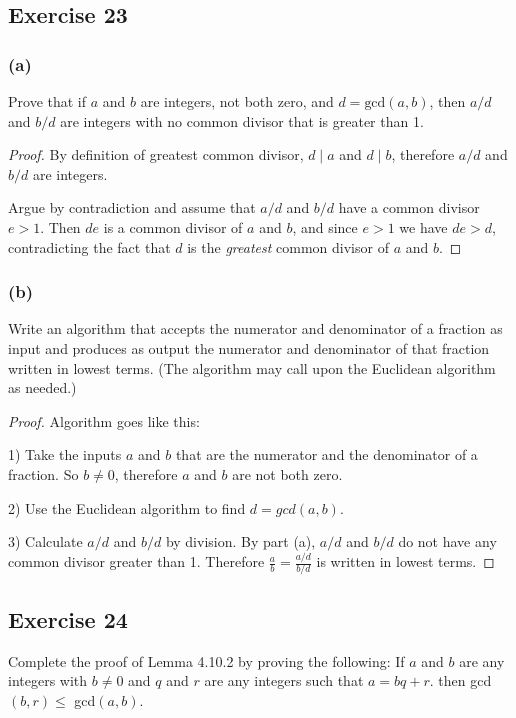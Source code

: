 \documentclass[14pt]{extarticle}
\newcommand{\dps}{\displaystyle}
\begin{document}
\subsection{Exercise 23}
\subsubsection{(a)}
Prove that if $a$ and $b$ are integers, not both zero, and $d = \text{gcd}(a, b)$, then $a/d$ and $b/d$ are integers with no common divisor that is greater than 1.

\begin{proof}
    By definition of greatest common divisor, $d \mid a$ and $d \mid b$, therefore $a/d$ and $b/d$ are integers.

    Argue by contradiction and assume that $a/d$ and $b/d$ have a common divisor $e > 1$. Then $de$ is a common divisor of $a$ and $b$, and since $e > 1$ we have $de > d$, contradicting the fact that $d$ is the {\it greatest} common divisor of $a$ and $b$.
\end{proof}

\subsubsection{(b)}
Write an algorithm that accepts the numerator and denominator of a fraction as input and produces as output the numerator and denominator of that fraction written in lowest terms. (The algorithm may call upon the Euclidean algorithm as needed.)

\begin{proof}
    Algorithm goes like this:

    1) Take the inputs $a$ and $b$ that are the numerator and the denominator of a fraction. So $b \neq 0$, therefore $a$ and $b$ are not both zero.

    2) Use the Euclidean algorithm to find $d = gcd(a,b)$.

    3) Calculate $a/d$ and $b/d$ by division. By part (a), $a/d$ and $b/d$ do not have any common divisor greater than 1. Therefore $\dps\frac{a}{b} = \frac{a/d}{b/d}$ is written in lowest terms.
\end{proof}

\subsection{Exercise 24}
Complete the proof of Lemma 4.10.2 by proving the following: If $a$ and $b$ are any integers with $b \neq 0$ and $q$ and $r$ are any integers such that $a = bq + r$.
then gcd$(b, r) \leq$ gcd$(a, b)$.
\end{document}
